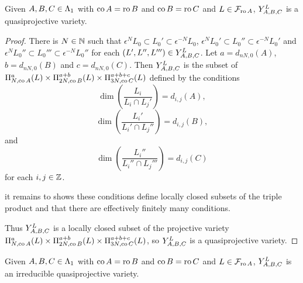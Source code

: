 \documentclass[a4paper, 11pt]{report}
\begin{document}
\begin{lemma}\label{lemma:y-triple-is-quasiprojective}
Given $A,B,C\in\matrices$ with $\co{A}=\ro{B}$ and $\co{B}=\ro{C}$ and $L\in\flags_{\ro{A}}$, $\yprod[L]{A,B,C}$ is a quasiprojective variety.
\end{lemma}

\begin{proof}
There is $N\in\naturals$ such that $\epsilon^N L_0\subset L_0'\subset \epsilon^{-N}L_0$, $\epsilon^N L_0'\subset L_0''\subset \epsilon^{-N}L_0'$ and $\epsilon^N L_0''\subset L_0'''\subset\epsilon^{-N}L_0''$ for each $(L',L'',L''')\in\yprod[L]{A,B,C}$. Let $a=d_{nN,0}(A)$, $b=d_{nN,0}(B)$ and $c=d_{nN,0}(C)$. Then $\yprod[L]{A,B,C}$ is the subset of $\Pi_{N,\co{A}}^a(L)\times\Pi_{2N,\co{B}}^{a+b}(L)\times\Pi_{3N,\co{C}}^{a+b+c}(L)$ defined by the conditions
\begin{equation*}
\dim\left(\frac{L_i}{L_i\cap L_j'}\right) = d_{i,j}(A),
\end{equation*}
\begin{equation*}
\dim\left(\frac{L_i'}{L_i'\cap L_j''}\right) = d_{i,j}(B),
\end{equation*}
and
\begin{equation*}
\dim\left(\frac{L_i''}{L_i''\cap L_j'''}\right) = d_{i,j}(C)
\end{equation*}
for each $i,j\in\integers$.

{\color{blue} it remains to shows these conditions define locally closed subsets of the triple product and that there are effectively finitely many conditions}.

Thus $\yprod[L]{A,B,C}$ is a locally closed subset of the projective variety $\Pi_{N,\co{A}}^a(L)\times\Pi_{2N,\co{B}}^{a+b}(L)\times\Pi_{3N,\co{C}}^{a+b+c}(L)$, so $\yprod[L]{A,B,C}$ is a quasiprojective variety.
\end{proof}

\begin{lemma}\label{lemma:irreducible-y-triple}
Given $A,B,C\in\matrices$ with $\co{A}=\ro{B}$ and $\co{B}=\ro{C}$ and $L\in\flags_{\ro{A}}$, $\yprod[L]{A,B,C}$ is an irreducible quasiprojective variety.
\end{lemma}
\end{document}
